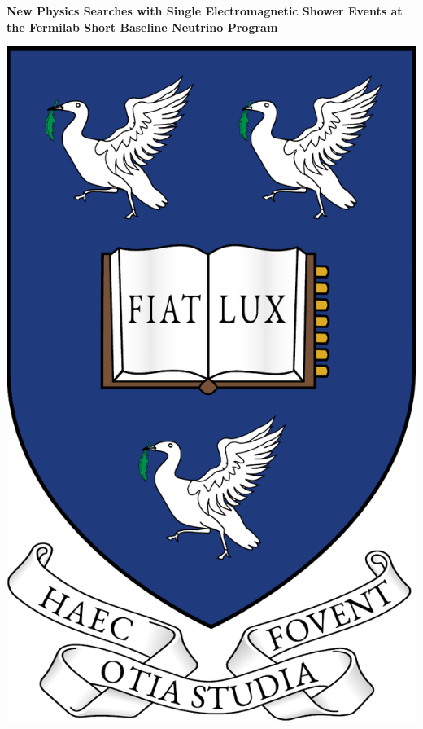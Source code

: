 \thispagestyle{empty}
\vfill
\begin{center}
	\begin{minipage}{1\linewidth}
		\centering
		\vspace{0.5cm}		
		{\Huge \textbf{New Physics Searches with Single Electromagnetic Shower Events at the Fermilab Short Baseline Neutrino Program}\par}
		\vspace{1.5cm}
		\includegraphics[width=0.5\smallfigwidth]{figures-coat_of_arms/Arms_of_the_University_of_Liverpool.pdf} \par

\end{minipage}
\end{center}
